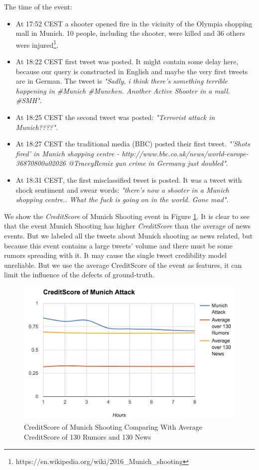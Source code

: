  The time of the event:
 \begin{itemize}
 	
 
\item  At 17:52 CEST a shooter opened fire in the vicinity of the Olympia shopping mall in Munich. 10 people, including the shooter, were killed and 36 others were injured\footnote{https://en.wikipedia.org/wiki/2016\_Munich\_shooting}. 

\item  At 18:22 CEST first tweet was posted. It might contain some delay here, because our query is constructed in English and maybe the very first tweets are in German. The tweet is \emph{"Sadly, i think there's something terrible happening in \#Munich \#Munchen. Another Active Shooter in a mall. \#SMH"}. 
\item At 18:25 CEST the second tweet was posted: \emph{"Terrorist attack in Munich????"}.   

\item  At 18:27 CEST the traditional media (BBC) posted their first tweet. \emph{"'Shots fired' in Munich shopping centre - http://www.bbc.co.uk/news/world-europe-36870800a02026 @TraceyRemix gun crime in Germany just doubled"}.

\item At 18:31 CEST, the first misclassified tweet is posted. It was a tweet with shock sentiment and swear words: \emph{"there's now a shooter in a Munich shopping centre.. What the fuck is going on in the world. Gone mad"}.
\end{itemize}

We show the \emph{CreditScore} of Munich Shooting event in Figure \ref{fig:munichattackCS}. It is clear to see that the event Munich Shooting has higher \emph{CreditScore} than the average of news events. But we labeled all the tweets about Munich shooting as news related, but because this event contains a large tweets' volume and there must be some rumors spreading with it. It may cause the single tweet credibility model unreliable. But we use the average CreditScore of the event as features, it can limit the influence of the defects of ground-truth.
  \begin{figure}[!h]
\centering
\includegraphics[width=0.7\columnwidth]{images/munichCD.png}
\caption{CreditScore of Munich Shooting Comparing With Average CreditScore of 130 Rumors and 130 News}
\label{fig:munichattackCS}
\end{figure}

